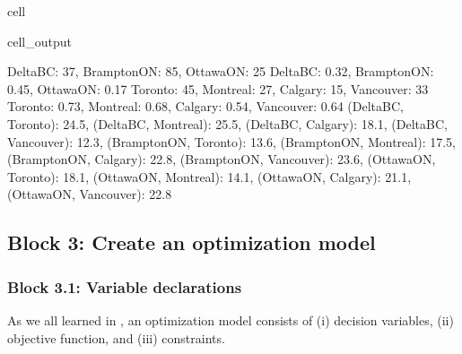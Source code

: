 \documentclass[letterpaper,10pt,english]{jupyterBook}
\begin{document}
\begin{sphinxuseclass}{cell}
\begin{sphinxVerbatimOutput}
\begin{sphinxuseclass}{cell_output}
\begin{sphinxVerbatim}[commandchars=\\\{\}]
\PYGZob{}\PYGZsq{}Delta\PYGZhy{}BC\PYGZsq{}: 37, \PYGZsq{}Brampton\PYGZhy{}ON\PYGZsq{}: 85, \PYGZsq{}Ottawa\PYGZhy{}ON\PYGZsq{}: 25\PYGZcb{}
\PYGZob{}\PYGZsq{}Delta\PYGZhy{}BC\PYGZsq{}: 0.32, \PYGZsq{}Brampton\PYGZhy{}ON\PYGZsq{}: 0.45, \PYGZsq{}Ottawa\PYGZhy{}ON\PYGZsq{}: 0.17\PYGZcb{}
\PYGZob{}\PYGZsq{}Toronto\PYGZsq{}: 45, \PYGZsq{}Montreal\PYGZsq{}: 27, \PYGZsq{}Calgary\PYGZsq{}: 15, \PYGZsq{}Vancouver\PYGZsq{}: 33\PYGZcb{}
\PYGZob{}\PYGZsq{}Toronto\PYGZsq{}: 0.73, \PYGZsq{}Montreal\PYGZsq{}: 0.68, \PYGZsq{}Calgary\PYGZsq{}: 0.54, \PYGZsq{}Vancouver\PYGZsq{}: 0.64\PYGZcb{}
\PYGZob{}(\PYGZsq{}Delta\PYGZhy{}BC\PYGZsq{}, \PYGZsq{}Toronto\PYGZsq{}): 24.5, (\PYGZsq{}Delta\PYGZhy{}BC\PYGZsq{}, \PYGZsq{}Montreal\PYGZsq{}): 25.5, (\PYGZsq{}Delta\PYGZhy{}BC\PYGZsq{}, \PYGZsq{}Calgary\PYGZsq{}): 18.1, (\PYGZsq{}Delta\PYGZhy{}BC\PYGZsq{}, \PYGZsq{}Vancouver\PYGZsq{}): 12.3, (\PYGZsq{}Brampton\PYGZhy{}ON\PYGZsq{}, \PYGZsq{}Toronto\PYGZsq{}): 13.6, (\PYGZsq{}Brampton\PYGZhy{}ON\PYGZsq{}, \PYGZsq{}Montreal\PYGZsq{}): 17.5, (\PYGZsq{}Brampton\PYGZhy{}ON\PYGZsq{}, \PYGZsq{}Calgary\PYGZsq{}): 22.8, (\PYGZsq{}Brampton\PYGZhy{}ON\PYGZsq{}, \PYGZsq{}Vancouver\PYGZsq{}): 23.6, (\PYGZsq{}Ottawa\PYGZhy{}ON\PYGZsq{}, \PYGZsq{}Toronto\PYGZsq{}): 18.1, (\PYGZsq{}Ottawa\PYGZhy{}ON\PYGZsq{}, \PYGZsq{}Montreal\PYGZsq{}): 14.1, (\PYGZsq{}Ottawa\PYGZhy{}ON\PYGZsq{}, \PYGZsq{}Calgary\PYGZsq{}): 21.1, (\PYGZsq{}Ottawa\PYGZhy{}ON\PYGZsq{}, \PYGZsq{}Vancouver\PYGZsq{}): 22.8\PYGZcb{}
\end{sphinxVerbatim}

\end{sphinxuseclass}\end{sphinxVerbatimOutput}

\end{sphinxuseclass}

\subsection{Block 3: Create an optimization model}
\label{\detokenize{docs/Case2_1_Module1_Online_Fulfillment_Script:block-3-create-an-optimization-model}}

\subsubsection{Block 3.1: Variable declarations}
\label{\detokenize{docs/Case2_1_Module1_Online_Fulfillment_Script:block-3-1-variable-declarations}}
\sphinxAtStartPar
As we all learned in , an optimization model consists of (i) decision variables, (ii) objective function, and (iii) constraints.
\end{document}
